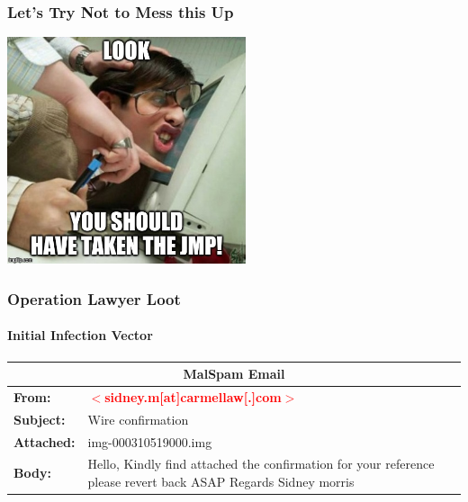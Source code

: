 \documentclass[aspectratio=169]{beamer}
\begin{document}
\begin{frame}
  \frametitle{Let's Try Not to Mess this Up}
  \begin{center}
    \includegraphics[width=7cm]{jmp-meme}
  \end{center}
\end{frame}

{
\begin{frame}
  \frametitle{Operation Lawyer Loot}
  \framesubtitle{Initial Infection Vector}
  \begin{tabularx}{\textwidth}{ |X|X| }
    \hline
    \multicolumn{2}{|c|}{\textbf{MalSpam Email}} \\
    \hline
    \textbf{From:} & \textbf{\textcolor{red}{$<$sidney.m[at]carmellaw[.]com$>$}} \\
    \hline
    \textbf{Subject:} & Wire confirmation \\
    \hline
    \textbf{Attached:} & img-000310519000.img \\
    \hline
    \textbf{Body:} & Hello,
    \newline
    \newline
    Kindly find attached the confirmation for your reference
    \newline
    \newline
    please revert back ASAP
    \newline
    \newline
    Regards
    \newline
    \newline
    Sidney morris \\
    \hline
  \end{tabularx}
\end{frame}
}
\end{document}
